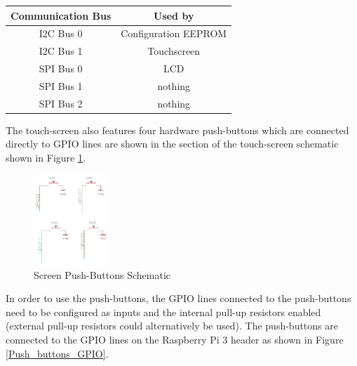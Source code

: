 \documentclass{article}
\begin{document}
	\begin{table}
		\centering
		
		\begin{tabular}[H]{| c | c |}
			\hline
			\textbf{Communication Bus} & \textbf{Used by} \\
			\hline
			I2C Bus 0 & Configuration EEPROM \\
			\hline
			I2C Bus 1 & Touchscreen \\
			\hline
			SPI Bus 0 & LCD \\
			\hline
			SPI Bus 1 & nothing \\
			\hline
			SPI Bus 2 & nothing \\
			\hline
		\end{tabular}
	\end{table}


The touch-screen also features four hardware push-buttons which are connected directly to GPIO lines are shown in the section of the touch-screen schematic shown in Figure \ref{Push_buttons_schematic}.


	\begin{figure}[H]
		\centering
		\includegraphics[width=0.25\textwidth]{pics/PiTFT_2-8_push-buttons_section_schematic.png}
		\caption{Screen Push-Buttons Schematic}
		\label{Push_buttons_schematic}
	\end{figure}


In order to use the push-buttons, the GPIO lines connected to the push-buttons need to be configured as inputs and the internal pull-up resistors enabled (external pull-up resistors could alternatively be used). The push-buttons are connected to the GPIO lines on the Raspberry Pi 3 header as shown in Figure \ref{Push_buttons_GPIO}.
\end{document}
